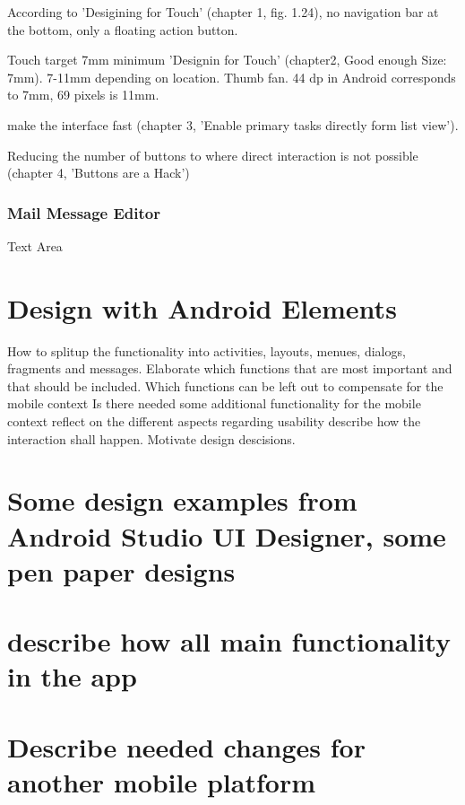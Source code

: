 \documentclass[a4paper,11pt,twoside]{article}
\begin{document}
According to 'Desigining for Touch' (chapter 1, fig. 1.24), no navigation bar at the bottom, only
a floating action button.

Touch target 7mm minimum 'Designin for Touch' (chapter2, Good enough Size: 7mm).
7-11mm depending on location. Thumb fan. 44 dp in Android corresponds to 7mm,
69 pixels is 11mm.

make the interface fast (chapter 3, 'Enable primary tasks directly form list view').

Reducing the number of buttons to where direct interaction is not possible (chapter 4, 'Buttons are a Hack')

\subsubsection{Mail Message Editor}
Text Area



\section{Design with Android Elements}
How to splitup the functionality into activities, layouts, menues, dialogs, fragments and messages.
Elaborate which functions that are most important and that should be included.
Which functions can be left out to compensate for the mobile context
Is there needed some additional functionality for the mobile context
reflect on the different aspects regarding usability
describe how the interaction shall happen.
Motivate design descisions.

\section{Some design examples from Android Studio UI Designer, some pen paper designs}

\section{describe how all main functionality in the app}


\section{Describe needed changes for another mobile platform}



\end{document}
